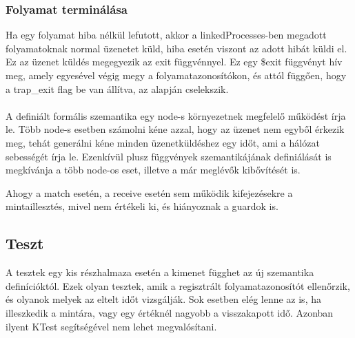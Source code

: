 \documentclass[]{article}
\begin{document}
\subsubsection*{Folyamat terminálása}
Ha egy folyamat hiba nélkül lefutott, akkor a linkedProcesses-ben megadott folyamatoknak normal üzenetet küld, hiba esetén viszont az adott hibát küldi el. Ez az üzenet küldés megegyezik az exit függvénnyel. Ez egy \$exit függvényt hív meg, amely egyesével végig megy a folyamatazonosítókon, és attól függően, hogy a trap\_exit flag be van állítva, az alapján cselekszik.

\paragraph*{}
A definiált formális szemantika egy node-s környezetnek megfelelő működést írja le. Több node-s esetben számolni kéne azzal, hogy az üzenet nem egyből érkezik meg, tehát generálni kéne minden üzenetküldéshez egy időt, ami a hálózat sebességét írja le. Ezenkívül plusz függvények szemantikájának definiálását is megkívánja a több node-os eset, illetve a már meglévők kibővítését is.

Ahogy a match esetén, a receive esetén sem működik kifejezésekre a mintaillesztés, mivel nem értékeli ki, és hiányoznak a guardok is.


\subsection*{Teszt}
A tesztek egy kis részhalmaza esetén a kimenet függhet az új szemantika definícióktól. Ezek olyan tesztek, amik a regisztrált folyamatazonosítót ellenőrzik, és olyanok melyek az eltelt időt vizsgálják. Sok esetben elég lenne az is, ha illeszkedik a mintára, vagy egy értéknél nagyobb a visszakapott idő. Azonban ilyent KTest segítségével nem lehet megvalósítani.
\end{document}
